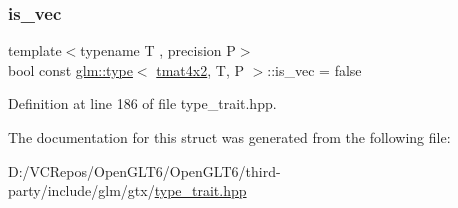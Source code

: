 \subsubsection{\texorpdfstring{is\_vec}{is\_vec}}
{\footnotesize\ttfamily template$<$typename T , precision P$>$ \\
bool const \mbox{\hyperlink{structglm_1_1type}{glm\+::type}}$<$ \mbox{\hyperlink{structglm_1_1tmat4x2}{tmat4x2}}, T, P $>$\+::is\+\_\+vec = false\hspace{0.3cm}{\ttfamily [static]}}



Definition at line 186 of file type\+\_\+trait.\+hpp.



The documentation for this struct was generated from the following file\+:\begin{DoxyCompactItemize}
\item 
D\+:/\+V\+C\+Repos/\+Open\+G\+L\+T6/\+Open\+G\+L\+T6/third-\/party/include/glm/gtx/\mbox{\hyperlink{type__trait_8hpp}{type\+\_\+trait.\+hpp}}\end{DoxyCompactItemize}
